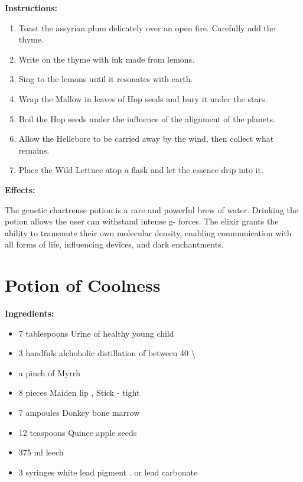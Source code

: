 \documentclass{article}
\begin{document}
\textbf{Instructions:}

\begin{enumerate}
  \item Toast the assyrian plum delicately over an open fire. Carefully add the thyme.
  \item Write on the thyme with ink made from lemons.
  \item Sing to the lemons until it resonates with earth.
  \item Wrap the Mallow in leaves of Hop seeds and bury it under the stars.
  \item Boil the Hop seeds under the influence of the alignment of the planets.
  \item Allow the Hellebore to be carried away by the wind, then collect what remains.
  \item Place the Wild Lettuce atop a flask and let the essence drip into it.
\end{enumerate}

\textbf{Effects:}

The genetic chartreuse potion is a rare and powerful brew of water. Drinking the potion allows the user can withstand intense g- forces. The elixir grants the ability to transmute their own molecular density, enabling communication with all forms of life, influencing devices, and dark enchantments.

\newpage
\section*{Potion of Coolness}

\textbf{Ingredients:}

\begin{itemize}
  \item 7 tablespoons Urine of healthy young child
  \item 3 handfuls alchoholic distillation of between 40 \textbackslash{}%
  \item a pinch of Myrrh
  \item 8 pieces Maiden lip , Stick - tight
  \item 7 ampoules Donkey bone marrow
  \item 12 teaspoons Quince apple seeds
  \item 375 ml leech
  \item 3 syringes white lead pigment . or lead carbonate
\end{itemize}
\end{document}
